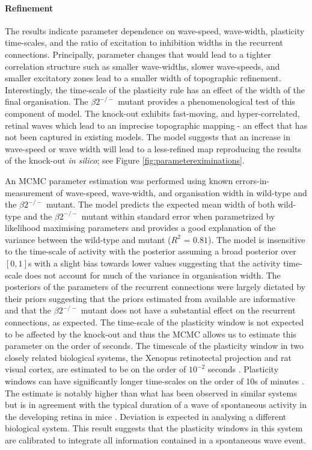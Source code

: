 \paragraph{Refinement}
The results indicate parameter dependence on wave-speed, wave-width, plasticity time-scales, and the ratio of excitation to inhibition widths in the recurrent connections. Principally, parameter changes that would lead to a tighter correlation structure such as smaller wave-widths, slower wave-speeds, and smaller excitatory zones lead to a smaller width of topographic refinement. Interestingly, the time-scale of the plasticity rule has an effect of the width of the final organisation. The $\beta2^{-/-}$ mutant provides a phenomenological test of this component of model. The knock-out exhibits fast-moving, and hyper-correlated, retinal waves which lead to an imprecise topographic mapping - an effect that has not been captured in existing models. The model suggests that an increase in wave-speed or wave width will lead to a less-refined map reproducing the results of the knock-out \textit{in silico}; see Figure \ref{fig:parametereximinations}. 

An MCMC parameter estimation was performed using known errors-in-measurement of wave-speed, wave-width, and organisation width in wild-type and the $\beta2^{-/-}$ mutant. The model predicts the expected mean width of both wild-type and the $\beta2^{-/-}$ mutant within standard error when parametrized by likelihood maximising parameters and provides a good explanation of the variance between the wild-type and mutant ($R^2$ = $0.81$).  The model is insensitive to the time-scale of activity with the posterior assuming a broad posterior over $[0,1]$s with a slight bias towards lower values suggesting that the activity time-scale does not account for much of the variance in organisation width. The posteriors of the parameters of the recurrent connections were largely dictated by their priors suggesting that the priors estimated from available are informative and that the $\beta2^{-/-}$ mutant does not have a substantial effect on the recurrent connections, as expected. The time-scale of the plasticity window is not expected to be affected by the knock-out and thus the MCMC allows us to estimate this parameter on the order of seconds. { The timescale of the plasticity window in two closely related biological systems, the Xenopus retinotectal projection and rat visual cortex, are estimated to be on the order of $10^{-2}$ seconds \cite{Froemke2002-be, Zhang2000-lb}. Plasticity windows can have significantly longer time-scales on the order of 10s of minutes \cite{Citri2008-kv}. The estimate is notably higher than what has been observed in similar systems but is in agreement with the typical duration of a wave of spontaneous activity in the developing retina in mice \cite{Xu2015-uc}. Deviation is expected in analysing a different biological system. This result suggests that the plasticity windows in this system are calibrated to integrate all information contained in a spontaneous wave event.}
